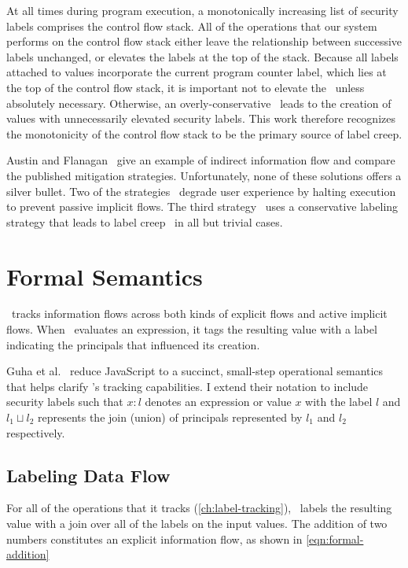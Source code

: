 At all times during program execution, a monotonically increasing list of security labels comprises the control flow stack.
All of the operations that our system performs on the control flow stack either leave the relationship between successive labels unchanged, or elevates the labels at the top of the stack.
Because all labels attached to values incorporate the current program counter label, which lies at the top of the control flow stack, it is important not to elevate the \pclabel\ unless absolutely necessary.
Otherwise, an overly-conservative \pclabel\ leads to the creation of values with unnecessarily elevated security labels.
This work therefore recognizes the monotonicity of the control flow stack to be the primary source of label creep.

Austin and Flanagan~\cite{austin.flanagan+12} give an example of indirect information flow and compare the published mitigation strategies.
Unfortunately, none of these solutions offers a silver bullet.
Two of the strategies~\cite{zdancewic+02,austin.flanagan+10} degrade user experience by halting execution to prevent passive implicit flows.
The third strategy~\cite{vogt.etal+07} uses a conservative labeling strategy that leads to label creep~\cite{sabelfeld.myers+03} in all but trivial cases.

\section{Formal Semantics}

\FlowCore\ tracks information flows across both kinds of explicit flows and active implicit flows.
When \FlowCore\ evaluates an expression, it tags the resulting value with a label indicating the principals that influenced its creation.

Guha et al.~\cite{guha.etal+10} reduce JavaScript to a succinct, small-step operational semantics that helps clarify \FlowCore's tracking capabilities.
I extend their notation to include security labels such that $x:l$ denotes an expression or value $x$ with the label $l$ and $l_1 \sqcup l_2$ represents the join (union) of principals represented by $l_1$ and $l_2$ respectively.

\subsection{Labeling Data Flow}

For all of the operations that it tracks (\autoref{ch:label-tracking}), \FlowCore\ labels the resulting value with a join over all of the labels on the input values.
The addition of two numbers constitutes an explicit information flow, as shown in \autoref{eqn:formal-addition}

